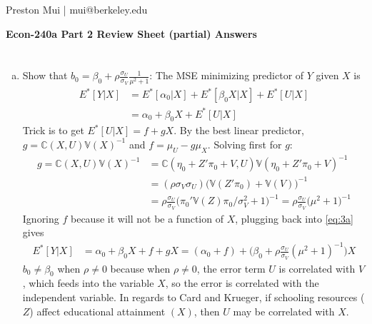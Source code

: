 \documentclass{article}[12pt]
\begin{document}
\begin{center}
	Preston Mui | mui@berkeley.edu

	{\bf Econ-240a Part 2 Review Sheet (partial) Answers}
\end{center}

\setcounter{section}{2}
\section{}
\begin{enumerate}[(a)]
	\item Show that $b_0 = \beta_0 + \rho \frac{\sigma_U}{\sigma_V} \frac{1}{\mu^2 + 1}$: The MSE minimizing predictor of $Y$ given $X$ is
	\begin{align}
		E^*[Y | X] &= E^*[\alpha_0 | X ] + E^*[\beta_0 X | X] + E^*[U | X] \nonumber \\
		&= \alpha_0 + \beta_0 X + E^*[U | X] \label{eq:3a}
	\end{align}
	Trick is to get $E^*[U | X] = f + gX$. By the best linear predictor, $g = \mathbb{C}(X,U) \mathbb{V}(X)^{-1}$ and $f = \mu_U - g \mu_X$. Solving first for $g$:
	\begin{align*}
		g = \mathbb{C}(X,U) \mathbb{V}(X)^{-1} &= \mathbb{C}(\eta_0 + Z' \pi_0 + V,U) \mathbb{V}(\eta_0 + Z'\pi_0 + V)^{-1} \\
		&= (\rho \sigma_V \sigma_U) \Big(\mathbb{V}(Z'\pi_0) + \mathbb{V}(V) \Big)^{-1} \\
		&= \rho \frac{\sigma_U}{\sigma_V}\Big( \pi_0' \mathbb{V}(Z) \pi_0/ \sigma_V^2 + 1 \Big)^{-1} = \rho \frac{\sigma_U}{\sigma_V}\Big( \mu^2 + 1 \Big)^{-1}
	\end{align*}
	Ignoring $f$ because it will not be a function of $X$, plugging back into \eqref{eq:3a} gives
	\begin{align*}
		E^*[Y | X] &= \alpha_0 + \beta_0 X + f + gX = (\alpha_0 + f) + \Big(\beta_0 + \rho \frac{\sigma_U}{\sigma_V}( \mu^2 + 1 )^{-1}\Big) X
	\end{align*}
	$b_0 \neq \beta_0$ when $\rho \neq 0$ because when $\rho \neq 0$, the error term $U$ is correlated with $V$, which feeds into the variable $X$, so the error is correlated with the independent variable. In regards to Card and Krueger, if schooling resources ($Z$) affect educational attainment $(X)$, then $U$ may be correlated with $X$.
	

\end{enumerate}
\end{document}
